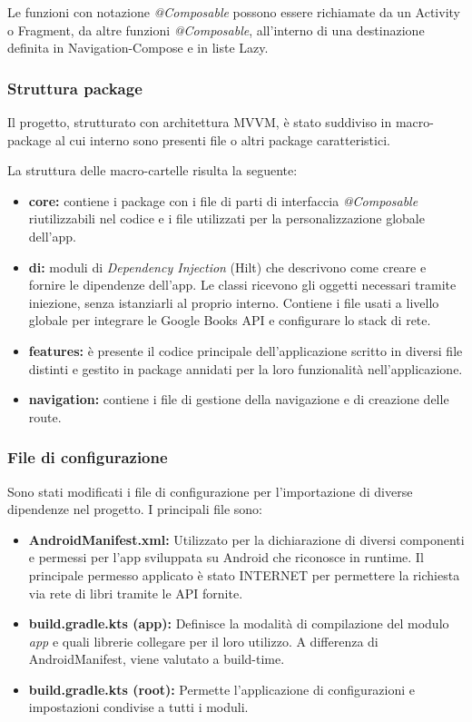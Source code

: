 \documentclass{article}
\begin{document}
Le funzioni con notazione \textit{@Composable} possono essere richiamate da un Activity o Fragment, da altre funzioni \textit{@Composable}, 
all'interno di una destinazione definita in Navigation-Compose e in liste Lazy.

\subsubsection{Struttura package}
Il progetto, strutturato con architettura MVVM, è stato suddiviso in macro-package al cui interno sono presenti file o altri package caratteristici.

La struttura delle macro-cartelle risulta la seguente:

\begin{itemize}
  \item \textbf{core:} contiene i package con i file di parti di interfaccia
  \textit{@Composable} riutilizzabili nel codice e i file utilizzati per la personalizzazione globale dell'app.
  \item \textbf{di:} moduli di \textit{Dependency Injection} (Hilt) che descrivono come creare e fornire le dipendenze dell’app. 
  Le classi ricevono gli oggetti necessari tramite iniezione, senza istanziarli al proprio interno. 
  Contiene i file usati a livello globale per integrare le Google Books API e configurare lo stack di rete.
  \item \textbf{features:} è presente il codice principale dell'applicazione scritto in diversi file distinti e gestito in package annidati per la loro funzionalità nell'applicazione.
  \item \textbf{navigation:} contiene i file di gestione della navigazione e di creazione delle route.
\end{itemize}

\subsubsection{File di configurazione}

Sono stati modificati i file di configurazione per l'importazione di diverse dipendenze nel progetto.
I principali file sono:

\begin{itemize}
  \item \textbf{AndroidManifest.xml:} Utilizzato per la dichiarazione di diversi componenti e permessi per l'app sviluppata su Android che riconosce in runtime.
  Il principale permesso applicato è stato INTERNET per permettere la richiesta via rete di libri tramite le API fornite.
  \item \textbf{build.gradle.kts (app):} Definisce la modalità di compilazione del modulo \textit{app} e quali librerie collegare per il loro utilizzo. A differenza di AndroidManifest, viene valutato a build-time.
  \item \textbf{build.gradle.kts (root):} Permette l'applicazione di configurazioni e impostazioni condivise a tutti i moduli.
\end{itemize}
\end{document}
